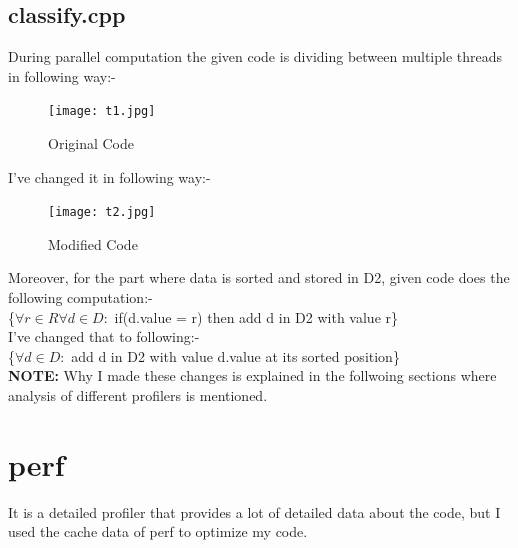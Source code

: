\documentclass{article}
\begin{document}
\pagebreak
\subsection{classify.cpp}
During parallel computation the given code is dividing between multiple threads in following way:- \\
\begin{figure}[H]
    \centering
    \texttt{[image: t1.jpg]}
    \caption{Original Code}
\end{figure}

I've changed it in following way:- \\
\begin{figure}[H]
    \centering
    \texttt{[image: t2.jpg]}
    \caption{Modified Code}
\end{figure}

Moreover, for the part where data is sorted and stored in D2, given code does the following computation:- \\
\{$\forall r \in R \forall d \in D :$ if(d.value = r) then add d in D2 with value r\}\\
I've changed that to following:- \\
\{$\forall d \in D :$ add d in D2 with value d.value at its sorted position\}\\

\textbf{NOTE: } Why I made these changes is explained in the follwoing sections where analysis of different profilers is mentioned.




\section{perf}
It is a detailed profiler that provides a lot of detailed data about the code, but I used the cache data of perf to optimize my code.
\end{document}
